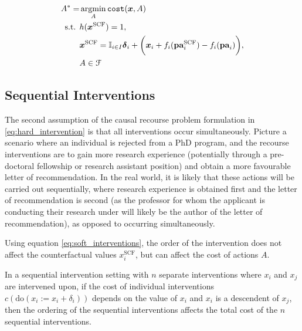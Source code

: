\begin{align} \label{eq:causal_recourse_problem_soft}
	A^* = & \operatorname*{argmin}_{A} \texttt{cost}(\boldsymbol{x}, A) \\ \nonumber
	\text{s.t. } & h(\boldsymbol{x}^{\text{SCF}}) = 1, \\ \nonumber
	& 	\boldsymbol{x}^{\text{SCF}} = \mathbb{I}_{i \in I} \boldsymbol{\delta}_i + \bigg( \boldsymbol{x}_i + f_i(\textbf{pa}^{\text{SCF}}_i) - f_i(\textbf{pa}_i) \bigg), \\ \nonumber
	& A \in \mathcal{F}
\end{align} 


\subsection{Sequential Interventions}

The second assumption of the causal recourse problem formulation in \ref{eq:hard_intervention} is that all interventions occur simultaneously. Picture a scenario where an individual is rejected from a PhD program, and the recourse interventions are to gain more research experience (potentially through a pre-doctoral fellowship or research assistant position) and obtain a more favourable letter of recommendation. In the real world, it is likely that these actions will be carried out sequentially, where research experience is obtained first and the letter of recommendation is second (as the professor for whom the applicant is conducting their research under will likely be the author of the letter of recommendation), as opposed to occurring simultaneously.

Using equation \ref{eq:soft_interventions}, the order of the intervention does not affect the counterfactual values $x^{\text{SCF}}_i$, but can affect the cost of actions $A$.


\begin{proposition} \label{sequential_proposition}
	In a sequential intervention setting with $n$ separate interventions where $x_i$ and $x_j$ are intervened upon, if the cost of individual interventions $c(\text{do}(x_i:=x_i + \delta_i))$ depends on the value of $x_i$ and $x_i$ is a descendent of $x_j$, then the ordering of the sequential interventions affects the total cost of the $n$ sequential interventions.
\end{proposition}


